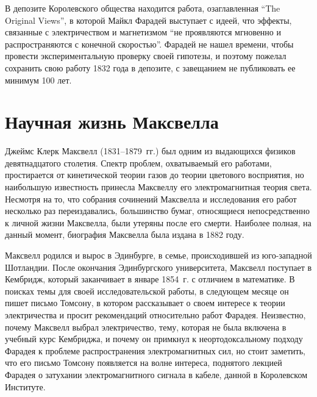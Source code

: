 \documentclass[12pt, oneside, a4paper]{article}
\begin{document}
В депозите Королевского общества находится работа, озаглавленная ``The Original Views'', в которой Майкл Фарадей выступает с идеей, что эффекты, связанные с электричеством и магнетизмом ``не проявляются мгновенно и распространяются с конечной скоростью''. Фарадей не нашел времени, чтобы провести экспериментальную проверку своей гипотезы, и поэтому пожелал сохранить свою работу 1832 года в депозите, с завещанием не публиковать ее минимум 100 лет.
\section{Научная жизнь Максвелла}
Джеймс Клерк Максвелл (1831--1879~гг.) был одним из выдающихся физиков девятнадцатого столетия. Спектр проблем, охватываемый его работами, простирается от кинетической теории газов до теории цветового восприятия, но наибольшую известность принесла Максвеллу его электромагнитная теория света. Несмотря на то, что собрания сочинений Максвелла и исследования его работ несколько раз переиздавались, большинство бумаг, относящиеся непосредственно к личной жизни Максвелла, были утеряны после его смерти. Наиболее полная, на данный момент, биография Максвелла была издана в 1882 году.

Максвелл родился и вырос в Эдинбурге, в семье, происходившей из юго-западной Шотландии. После окончания Эдинбургского университета, Максвелл поступает в Кембридж, который заканчивает в январе 1854~г. с отличием в математике. В поисках темы для своей исследовательской работы, в следующем месяце он пишет письмо Томсону, в котором рассказывает о своем интересе к теории электричества и просит рекомендаций относительно работ Фарадея. Неизвестно, почему Максвелл выбрал электричество, тему, которая не была включена в учебный курс Кембриджа, и почему он примкнул к неортодоксальному подходу Фарадея к проблеме распространения электромагнитных сил, но стоит заметить, что  его письмо Томсону появляется на волне интереса, поднятого лекцией Фарадея о затухании электромагнитного сигнала в кабеле, данной в Королевском Институте. 
\end{document}
